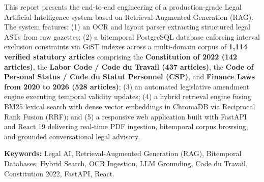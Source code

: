 \documentclass[12pt,a4paper]{report}
\begin{document}
This report presents the end-to-end engineering of a production-grade Legal Artificial Intelligence system based on Retrieval-Augmented Generation (RAG). The system features: (1) an OCR and layout parser extracting structured legal ASTs from raw gazettes; (2) a bitemporal PostgreSQL database enforcing interval exclusion constraints via GiST indexes across a multi-domain corpus of \textbf{1,114 verified statutory articles} comprising the \textbf{Constitution of 2022 (142 articles)}, the \textbf{Labor Code / Code du Travail (437 articles)}, the \textbf{Code of Personal Status / Code du Statut Personnel (CSP)}, and \textbf{Finance Laws from 2020 to 2026 (528 articles)}; (3) an automated legislative amendment engine executing temporal validity updates; (4) a hybrid retrieval engine fusing BM25 lexical search with dense vector embeddings in ChromaDB via Reciprocal Rank Fusion (RRF); and (5) a responsive web application built with FastAPI and React 19 delivering real-time PDF ingestion, bitemporal corpus browsing, and grounded conversational legal advisory.

\textbf{Keywords:} Legal AI, Retrieval-Augmented Generation (RAG), Bitemporal Databases, Hybrid Search, OCR Ingestion, LLM Grounding, Code du Travail, Constitution 2022, FastAPI, React.
\end{document}
